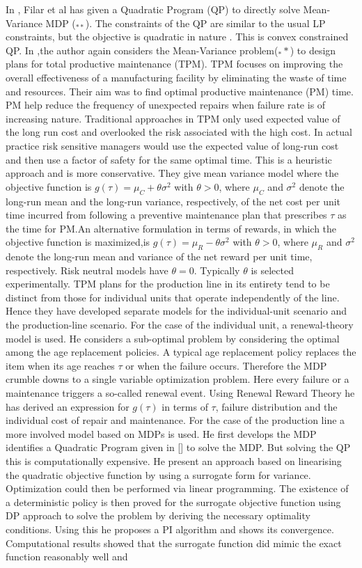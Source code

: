\documentclass[11pt,a4paper,oneside]{report}
\begin{document}
In \citep{filar1989variance}, Filar et al has given a Quadratic Program (QP) to directly solve Mean-Variance MDP ($_{**}$). The constraints of the QP are similar to the usual LP constraints, but the objective is quadratic in nature \cite[equations(2.9)]{filar1989variance}. This is convex constrained QP.
In \cite{gosavi2006risk},the author again considers the Mean-Variance problem($_**$) to design plans for total productive maintenance (TPM). TPM  focuses on improving the overall effectiveness of a manufacturing facility by eliminating the waste of time and resources. Their aim was to find optimal productive maintenance (PM) time. PM help reduce the frequency of unexpected repairs when failure rate is of increasing nature. Traditional approaches in TPM only used expected value of the long run cost and overlooked the risk associated with the high cost. In actual practice risk sensitive managers would use the expected value of long-run cost and then use a factor of safety for the same optimal time. This is a heuristic approach and is more conservative. They give mean variance model where the objective function is $g(\tau)= \mu_C+ \theta {\sigma}^2$ with $\theta>0$, where $\mu_C$ and $\sigma^2$ denote the long-run mean and the long-run variance, respectively, of the net cost per unit time incurred from following a preventive maintenance plan that prescribes $\tau$ as the time for PM.An alternative formulation in terms of rewards, in which the objective function is maximized,is $g(\tau)= \mu_R- \theta {\sigma}^2$ with $\theta>0$, where $\mu_R$ and $\sigma^2$ denote the long-run mean and variance of the net reward per unit time, respectively. Risk neutral models have $\theta =0$. Typically $\theta$ is selected experimentally. TPM plans for the production line in its entirety tend to be distinct from those for individual units that operate independently of the line. Hence they have developed separate models for the individual-unit scenario and the production-line scenario. For the case of the individual unit, a renewal-theory model is used. He considers a sub-optimal problem by considering the optimal among the age replacement policies. A typical age replacement policy replaces the item when its age reaches $\tau$ or when the failure occurs. Therefore the MDP crumble downs to a single variable optimization problem. Here every failure or a maintenance triggers a so-called renewal event. Using Renewal Reward Theory he has derived an expression for $g(\tau)$ in terms of $\tau$, failure distribution and the individual cost of repair and maintenance. For the case of the production line a more involved model based on MDPs is used. He first develops the MDP identifies a Quadratic Program given in [] to solve the MDP. But solving the QP this is computationally expensive. He present an approach based on linearising the quadratic objective function by using a surrogate form for variance. Optimization could then be performed via linear programming. The existence of a deterministic policy is then proved for the surrogate objective function using DP approach to solve the problem by deriving the necessary optimality conditions. Using this he proposes a PI algorithm and shows its convergence. Computational results showed that the surrogate function did mimic the exact function reasonably well and 
\end{document}

